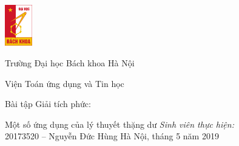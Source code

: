 \begin{titlepage}
	\parbox{4.2em}{
		\includegraphics[width=3.2em]{resources/bk.jpg}
	}
	\parbox{\textwidth-4.6em}{
		{\LARGE Trường Đại học Bách khoa Hà Nội\par}
		{\Large Viện Toán ứng dụng và Tin học}
	}
	\vfill
	\begin{center}
		{\Large Bài tập Giải tích phức:}\par
		{\LARGE Một số ứng dụng của lý thuyết thặng dư}
		\vfill
		\textit{Sinh viên thực hiện:}\\
		20173520 -- Nguyễn Đức Hùng
		\vfill
		Hà Nội, tháng 5 năm 2019
	\end{center}
\end{titlepage}

